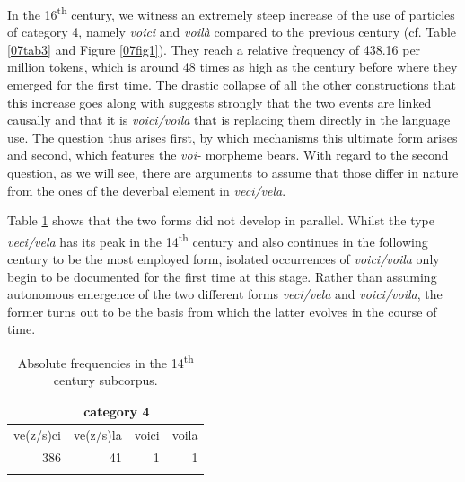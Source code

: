 \documentclass[output=paper,colorlinks,citecolor=brown]{langscibook}
\begin{document}
In the 16\textsuperscript{th} century, we witness an extremely steep increase of the use of  particles of category 4, namely \emph{voici} and \emph{voilà} compared to the previous century (cf. Table \ref{07tab3} and Figure \ref{07fig1}). They reach a relative frequency of 438.16 per million tokens, which is around 48 times as high as the century before where they emerged for the first time. The drastic collapse of all the other  constructions that this increase goes along with suggests strongly that the two events are linked causally and that it is \emph{voici/voila} that is replacing them directly in the language use. The question thus arises first, by which mechanisms this ultimate form arises and second, which features the \emph{voi-} morpheme bears. With regard to the second question, as we will see, there are arguments to assume that those differ in nature from the ones of the deverbal element in \emph{veci/vela}.

Table \ref{07tab5} shows that the two forms did not develop in parallel. Whilst the type \emph{veci/vela} has its peak in the 14\textsuperscript{th} century and also continues in the following century to be the most employed  form, isolated occurrences of \emph{voici/voila} only begin to be documented for the first time at this stage. Rather than assuming autonomous emergence of the two different forms \emph{veci/vela} and \emph{voici/voila}, the former turns out to be the basis from which the latter evolves in the course of time.

\begin{table}[ht]
	\centering
	\begin{tabularx}{0.5\textwidth}{rrrr}
		\lsptoprule
			\multicolumn{2}{c}{category 3} & \multicolumn{2}{c}{category 4} \\
			\midrule
			ve(z/s)ci & ve(z/s)la & voici & voila \\
			386 & 41 & 1 & 1 \\
		\lspbottomrule
	\end{tabularx}
	\caption{Absolute frequencies in the 14\textsuperscript{th} century subcorpus.}
	\label{07tab5}
\end{table}
\end{document}
